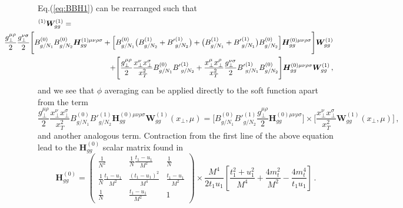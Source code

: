 \documentclass[a4paper,11pt]{report}
\numberwithin{equation}{section}
\newcommand{\bfH}{\bm{H}}
\begin{document}
Eq.(\ref{eq:BBH1}) can be rearranged such that
%
\begin{eqnarray}
  [BB\bfH]^{(1)}\bm{W}^{(1)}_{gg}  & = & 
  \nonumber \\
  & &
  \hspace{-100pt}
  \frac{ g_\perp^{\mu\rho}}{2} \frac{g_\perp^{\nu\sigma}}{2} 
  \Bigg[
  B_{g/N_1}^{(0)} B_{g/N_2}^{(0)}
  \bm{H}^{(1) \mu\nu\rho\sigma}_{gg}
  +
  \Big[
  B_{g/N_1}^{(0)} \big(B_{g/N_2}^{(1)} +  {B'}_{g/N_2}^{(1)}\big) +
  \big(B_{g/N_1}^{(1)} + {B'}_{g/N_1}^{(1)} \big) B_{g/N_2}^{(0)}
  \Big] 
  \bm{H}^{(0) \mu\nu\rho\sigma}_{gg}
  \Bigg]\bm{W}^{(1)}_{gg}
  \nonumber 
  \\
  & & \hspace{-72pt} +
  \Bigg[
  \frac{ g_\perp^{\mu\rho}}{2}
  \frac{x_\perp^\nu x_\perp^\sigma}{x_T^2}
  B_{g/N_1}^{(0)} {B'}_{g/N_2}^{(1)}
  +
  \frac{x_\perp^\mu x_\perp^\rho}{x_T^2}
  \frac{g_\perp^{\nu\sigma}}{2} 
  {B'}_{g/N_1}^{(1)} B_{g/N_2}^{(0)} 
  \Bigg]
  \bm{H}^{(0) \mu\nu\rho\sigma}_{gg}\bm{W}^{(1)}_{gg}\,,
  \label{eq:bbh1wgg1}
\end{eqnarray}
%
and we see that $\phi$ averaging can be applied directly to the soft function
apart from the term
\begin{equation}
  \frac{ g_\perp^{\mu\rho}}{2}
  \frac{x_\perp^\nu x_\perp^\sigma}{x_T^2}
  B_{g/N_1}^{(0)} {B'}_{g/N_2}^{(1)}
  \bm{H}^{(0) \mu\nu\rho\sigma}_{gg}\bm{W}^{(1)}_{gg} (x_\perp,\mu)
  = 
  \Big[
  B_{g/N_1}^{(0)} {B'}_{g/N_2}^{(1)}
  \frac{ g_\perp^{\mu\rho}}{2}
  \bm{H}^{(0) \mu\nu\rho\sigma}_{gg}
  \Big] \times
  \Big[
  \frac{x_\perp^\nu x_\perp^\sigma}{x_T^2}
  \bm{W}^{(1)}_{gg} (x_\perp,\mu)
  \Big]\,,
  \label{eq:mixed-rearr}
\end{equation}
%
and another analogous term. Contraction from the first line of the above
equation lead to the $\bm{H}_{gg}^{(0)}$ scalar matrix found
in~\cite{Li:2013mia}
%
\begin{equation}
  \bm{H}_{gg}^{(0)} =
  \left(\begin{array}{ccc}
  \frac{1}{N^2} & \frac{1}{N} \frac{t_1-u_1}{M^2} & \frac{1}{N} \\[0.5em]
  \frac{1}{N} \frac{t_1-u_1}{M^2} & \frac{(t_1-u_1)^2}{M^4} & 
  \frac{t_1-u_1}{M^2} \\[0.5em]
  \frac{1}{N} & \frac{t_1-u_1}{M^2} & 1
  \end{array}\right)
  \times
  \frac{M^4}{2 t_1 u_1}
  \left[
  \frac{t_1^2+u_1^2}{M^4} + \frac{4 m_t^2}{M^2} - \frac{4 m_t^4}{t_1 u_1}
  \right]\,.
  \label{eq:hard-function-scalar}
\end{equation}
\end{document}
